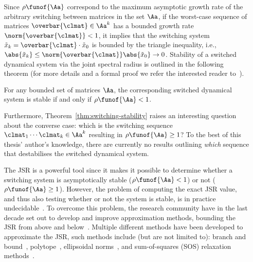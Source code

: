 Since $\rho\funof{\Aa}$ correspond to the maximum asymptotic growth rate of the arbitrary switching between matrices in the set $\Aa$, if the worst-case sequence of matrices $\overbar{\clmat} \in \Aa^k$ has a bounded growth rate $\norm{\overbar{\clmat}} < 1$, it implies that the switching system $\tilde{x}_k = \overbar{\clmat}\cdot \tilde{x}_0$ is bounded by the triangle inequality, i.e., $\abs{\tilde{x}_k} \leq \norm{\overbar{\clmat}}\abs{\tilde{x}_0} \rightarrow 0$.
Stability of a switched dynamical system via the joint spectral radius is outlined in the following theorem (for more details and a formal proof we refer the interested reader to~\cite{Jungers:2009}).
%
\begin{theorem}%
    \label{thm:switching-stability}%
    For any bounded set of matrices $\Aa$, the corresponding switched dynamical system is stable if and only if $\rho\funof{\Aa} < 1$.
\end{theorem}
%
Furthermore, Theorem~\ref{thm:switching-stability} raises an interesting question about the converse case: which is the switching sequence $\clmat_1 \cdots \clmat_k \in \Aa^k$ resulting in $\rho\funof{\Aa} \geq 1$?
To the best of this thesis' author's knowledge, there are currently no results outlining \emph{which} sequence that destabilises the switched dynamical system.

The JSR is a powerful tool since it makes it possible to determine whether a switching system is asymptotically stable ($\rho\funof{\Aa} < 1$) or not ($\rho\funof{\Aa} \geq 1$).
However, the problem of computing the exact JSR value, and thus also testing whether or not the system is stable, is in practice undecidable~\cite{Blondel:2000}.
To overcome this problem, the research community have in the last decade set out to develop and improve approximation methods, bounding the JSR from above and below~\cite{Jungers:2009}.
Multiple different methods have been developed to approximate the JSR, such methods include (but are not limited to): branch and bound~\cite{Gripenberg:1996}, polytope~\cite{Protasov:1996}, ellipsoidal norms~\cite{Blondel:2005, John:2014}, and sum-of-squares (SOS) relaxation methods~\cite{Parrilo:2008, Wang:2021a, Wang:2021b}.

